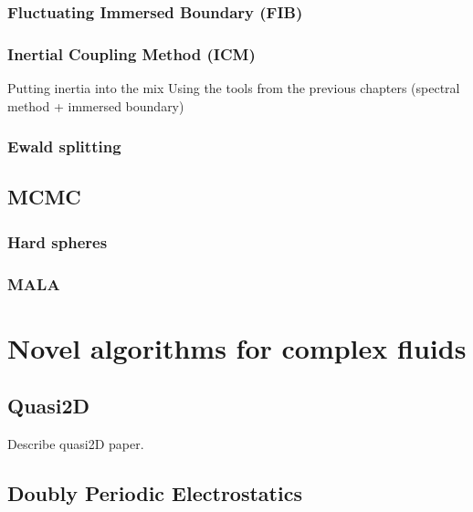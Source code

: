 \documentclass[ twoside,openright,titlepage,numbers=noenddot,%
headinclude,footinclude,cleardoublepage=empty,abstract=on,
BCOR=5mm,paper=a4,fontsize=11pt, dvipsnames
]{scrreprt}
\begin{document}
\section{Fluctuating Immersed Boundary (FIB)}


\section{Inertial Coupling Method (ICM)}

Putting inertia into the mix
Using the tools from the previous chapters (spectral method + immersed boundary)


\section{Ewald splitting}



\chapter{MCMC}

\section{Hard spheres}

\section{MALA}



\cleardoublepage
\part{Novel algorithms for complex fluids}\label{pt:algo}


\chapter{Quasi2D}

Describe quasi2D paper.



\chapter{Doubly Periodic Electrostatics}\label{ch:dppoisson}
\end{document}
